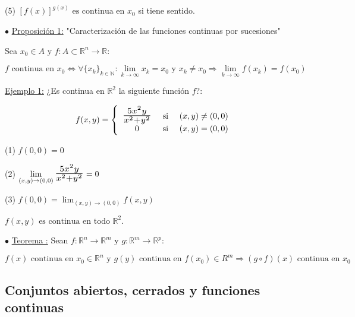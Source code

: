 \documentclass[10pt, titlepage]{article}
\newcommand{\R}{\mathbb{R}}
\newcommand{\N}{\mathbb{N}}
\newcommand{\bfrac}[2]{\scalebox{1.4}{$\frac{#1}{#2}$}}
\newcommand{\teorema}[1][\!\!]{\noindent$\bullet$ \underline{Teorema #1:} }
\newcommand{\proposicion}[1][\!\!]{\noindent$\bullet$ \underline{Proposición #1:} }
\begin{document}
\indent \indent (5) $[f (x)]^{g (x)} \text{ es continua en } x_0$ si tiene sentido.
\vspace{7mm}


\proposicion[1] "Caracterización de las funciones continuas por sucesiones"
\vspace{3mm}

Sea $x_0 \in A \text{ y } f : A \subset \R^n \to \R$:

\[
\boxed{
f \text{ continua en } x_0 \iff \forall{\{x_k\}_{k \in \N}} : \displaystyle \lim_{k \to  \infty} x_k = x_0 \text{ y }
 x_k \neq x_0 \Rightarrow \lim_{k \to \infty} f (x_k) = f (x_0)
}
\]
\vspace{3mm}

\underline{Ejemplo 1:} ¿Es continua en $\R^2$ la siguiente función $f$?:

\[
f (x, y) = \left \{
\begin{array}{ccc}

\bfrac{5x^2y}{x^2 + y^2} & \text{ si } & (x, y) \neq (0, 0) \\
0 & \text{ si } & (x, y) = (0, 0)\\

\end{array}\right.
\]
\vspace{3mm}

(1) $f (0, 0) = 0$
\vspace{3mm}

(2) $\displaystyle \lim_{(x, y) \to (0, 0)} \bfrac{5x^2y}{x^2 + y^2} = 0$
\vspace{3mm}

(3) $f (0, 0) = \displaystyle \lim_{(x, y) \to (0, 0)} f (x, y)$
\vspace{3mm}

$f (x, y) \text{ es continua en todo } \R^2$.
\vspace{7mm}

\teorema Sean $f : \R^n \to \R^m \text{ y } g : \R^m \to \R^p$:

\[
\boxed{
f (x) \text{ continua en } x_0 \in \R^n \text{ y } g (y) \text{ continua en } f (x_0) \in R^m \Rightarrow 
(g \circ f) (x) \text{ continua en } x_0
}
\]
\vspace{3mm}

\vspace{5mm}

\subsection{Conjuntos abiertos, cerrados y funciones continuas}
\vspace{3mm}
\end{document}
